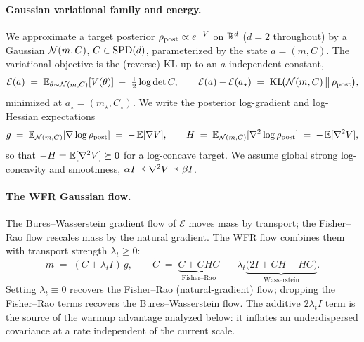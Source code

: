 \documentclass[11pt]{article}
\begin{document}
\paragraph{Gaussian variational family and energy.}
We approximate a target posterior $\rho_{\mathrm{post}} \propto e^{-V}$ on $\mathbb{R}^d$ ($d=2$
throughout) by a Gaussian $\mathcal{N}(m,C)$, $C\in\mathrm{SPD}(d)$, parameterized by the state
$a=(m,C)$. The variational objective is the (reverse) KL up to an
$a$-independent constant,
\begin{equation}
\label{eq:energy}
\mathcal{E}(a) \;=\; \mathbb{E}_{\theta\sim\mathcal{N}(m,C)}[V(\theta)] \;-\; \tfrac12\log\det C ,
\qquad
\mathcal{E}(a) - \mathcal{E}(a_\star) \;=\; \mathrm{KL}\!\big(\mathcal{N}(m,C)\,\big\|\,\rho_{\mathrm{post}}\big),
\end{equation}
minimized at $a_\star=(m_\star,C_\star)$. We write the posterior log-gradient
and log-Hessian expectations
\begin{equation}
\label{eq:gH}
g \;=\; \mathbb{E}_{\mathcal{N}(m,C)}[\nabla\log\rho_{\mathrm{post}}] \;=\; -\,\mathbb{E}[\nabla V],
\qquad
H \;=\; \mathbb{E}_{\mathcal{N}(m,C)}[\nabla^2\log\rho_{\mathrm{post}}] \;=\; -\,\mathbb{E}[\nabla^2 V],
\end{equation}
so that $-H=\mathbb{E}[\nabla^2 V]\succeq 0$ for a log-concave target. We assume global
strong log-concavity and smoothness, $\alpha I \preceq \nabla^2 V \preceq \beta I$.

\paragraph{The WFR Gaussian flow.}
The Bures--Wasserstein gradient flow of $\mathcal{E}$ moves mass by transport; the
Fisher--Rao flow rescales mass by the natural gradient. The WFR flow combines
them with transport strength $\lambda_t\ge 0$:
\begin{equation}
\label{eq:wfr-flow}
\dot m \;=\; (C+\lambda_t I)\,g, \qquad
\dot C \;=\; \underbrace{C + CHC}_{\text{Fisher--Rao}}
\;+\; \lambda_t\underbrace{\big(2I + CH + HC\big)}_{\text{Wasserstein}} .
\end{equation}
Setting $\lambda_t\equiv 0$ recovers the Fisher--Rao (natural-gradient) flow;
dropping the Fisher--Rao terms recovers the Bures--Wasserstein flow. The
additive $2\lambda_t I$ term is the source of the warmup advantage analyzed
below: it inflates an underdispersed covariance at a rate independent of the
current scale.
\end{document}
